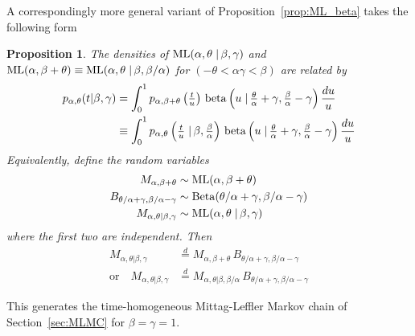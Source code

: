 \documentclass[a4paper,12pt]{article}
\newtheorem{proposition}{Proposition}
\begin{document}
{{{A correspondingly more general variant of Proposition~\ref{prop:ML_beta} takes the following form
\begin{proposition}
\label{prop:rho_Linnik_convdensitygen_beta}
The densities of ${\rm ML}(\alpha,\theta \left.\right\vert \beta,\gamma)$  and 
${\rm ML}(\alpha,\beta+\theta) \equiv {\rm ML}(\alpha,\theta \left.\right\vert \beta,\beta/\alpha)$ 
for $(-\theta<\alpha\gamma<\beta)$ are related by
\begin{align}
p_{\alpha,\theta}(t\vert \beta, \gamma)
 &= \int_0^1 p_{\alpha,\beta+\theta}\left(\tfrac{t}{u}\right) \, 
 {\rm beta} \left(u \left.\right\vert \tfrac{\theta}{\alpha}+\gamma, \tfrac{\beta}{\alpha}-\gamma\right) \frac{du}{u}
 \label{eq:rho_Linnik_convdensitygen_beta} \\
 &\equiv \int_0^1 p_{\alpha,\theta}\left(\tfrac{t}{u} \left. \right\vert \beta,\tfrac{\beta}{\alpha}\right) \, 
 {\rm beta} \left(u \left.\right\vert \tfrac{\theta}{\alpha}+\gamma, \tfrac{\beta}{\alpha}-\gamma\right) \frac{du}{u}
 \label{eq:rho_Linnik_convdensitygen_beta_1}
  \end{align}
Equivalently, define   the random variables 
\begin{align*}
M_{\alpha,\beta+\theta} &\sim {\rm ML}(\alpha,\beta+\theta) \\
B_{\theta/\alpha+\gamma,\beta/\alpha-\gamma} &\sim {\rm Beta}(\theta/\alpha+\gamma,\beta/\alpha-\gamma) \\
M_{\alpha,\theta\vert\beta,\gamma} &\sim {\rm ML}(\alpha,\theta \left.\right\vert \beta,\gamma)
\end{align*}
where the first two are independent. 
Then 
 \begin{align}
 M_{\alpha,\theta\vert\beta,\gamma} &\overset{d}{=} M_{\alpha,\beta+\theta} \, B_{\theta/\alpha+\gamma,\beta/\alpha-\gamma}
  \label{eq:ML4par_rvproduct} \\
  \textrm{or}\quad
 M_{\alpha,\theta\vert\beta,\gamma} &\overset{d}{=} 
 M_{\alpha,\theta\vert\beta,\beta/\alpha} \, B_{\theta/\alpha+\gamma,\beta/\alpha-\gamma}
  \label{eq:ML4par_rvproduct1}
 \end{align}
  \end{proposition}
 This generates  the  time-homogeneous Mittag-Leffler Markov chain of Section~\ref{sec:MLMC} for $\beta=\gamma=1$.

}}}
\end{document}
